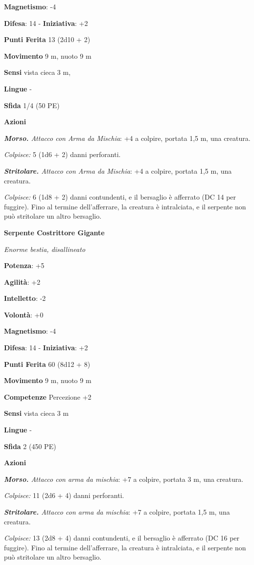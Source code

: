 \begin{multicols}{2}
\textbf{Magnetismo}: -4

\textbf{Difesa}: 14 - \textbf{Iniziativa}: +2

\textbf{Punti Ferita} 13 (2d10 + 2)

\textbf{Movimento} 9 m, nuoto 9 m

\textbf{Sensi} vista cieca 3 m, 

\textbf{Lingue} -

\textbf{Sfida} 1/4 (50 PE)

\textbf{Azioni}

\emph{\textbf{Morso.} Attacco con Arma da Mischia}: +4 a colpire,
portata 1,5 m, una creatura.

\emph{Colpisce:} 5 (1d6 + 2) danni perforanti.

\emph{\textbf{Stritolare.} Attacco con Arma da Mischia}: +4 a colpire,
portata 1,5 m, una creatura.

\emph{Colpisce:} 6 (1d8 + 2) danni contundenti, e il bersaglio è
afferrato (DC 14 per fuggire). Fino al termine dell'afferrare, la
creatura è intralciata, e il serpente non può stritolare un altro
bersaglio.

\textbf{Serpente Costrittore Gigante}

\emph{Enorme bestia, disallineato}

\textbf{Potenza}: +5

\textbf{Agilità}: +2

\textbf{Intelletto}: -2

\textbf{Volontà}: +0

\textbf{Magnetismo}: -4

\textbf{Difesa}: 14 - \textbf{Iniziativa}: +2

\textbf{Punti Ferita} 60 (8d12 + 8)

\textbf{Movimento} 9 m, nuoto 9 m

\textbf{Competenze} Percezione +2

\textbf{Sensi} vista cieca 3 m

\textbf{Lingue} -

\textbf{Sfida} 2 (450 PE)

\textbf{Azioni}

\emph{\textbf{Morso.} Attacco con arma da mischia}: +7 a colpire,
portata 3 m, una creatura.

\emph{Colpisce:} 11 (2d6 + 4) danni perforanti.

\emph{\textbf{Stritolare.} Attacco con arma da mischia}: +7 a colpire,
portata 1,5 m, una creatura.

\emph{Colpisce:} 13 (2d8 + 4) danni contundenti, e il bersaglio è
afferrato (DC 16 per fuggire). Fino al termine dell'afferrare, la
creatura è intralciata, e il serpente non può stritolare un altro
bersaglio.




\end{multicols}

